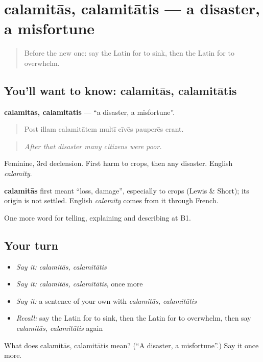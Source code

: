 \section[calamitās, calamitātis]{calamitās, calamitātis — a disaster, a misfortune}

\label{lesson:LA-C315-calamitas}



\begin{quote}
Before the new one: say the Latin for to sink, then the Latin for to overwhelm.
\end{quote}

\subsection*{You'll want to know: calamitās, calamitātis}
\textbf{calamitās, calamitātis} — \textquotedblleft{}a disaster, a misfortune\textquotedblright{}.

\begin{quote}
Post illam calamitātem multī cīvēs pauperēs erant.
\end{quote}

\begin{quote}
\emph{After that disaster many citizens were poor.}
\end{quote}

Feminine, 3rd declension. First harm to crops, then any disaster. English \emph{calamity}.

\begin{cousinweb}
\textbf{calamitās} first meant \textquotedblleft{}loss, damage\textquotedblright{}, especially to crops (Lewis \& Short); its origin is not settled. English \emph{calamity} comes from it through French.
\end{cousinweb}

\begin{grammarlens}[title={What you've built}]
One more word for telling, explaining and describing at B1.
\end{grammarlens}

\subsection*{Your turn}
\begin{itemize}
\raggedright
  \item \emph{Say it:} \emph{calamitās, calamitātis}
  \item \emph{Say it:} \emph{calamitās, calamitātis}, once more
  \item \emph{Say it:} a sentence of your own with \emph{calamitās, calamitātis}
  \item \emph{Recall:} say the Latin for to sink, then the Latin for to overwhelm, then say \emph{calamitās, calamitātis} again
\end{itemize}

\begin{tcolorbox}[breakable,colback=teal!4,colframe=teal!35!black,title={Before you move on}]
What does calamitās, calamitātis mean? (\textquotedblleft{}A disaster, a misfortune\textquotedblright{}.) Say it once more.
\end{tcolorbox}
